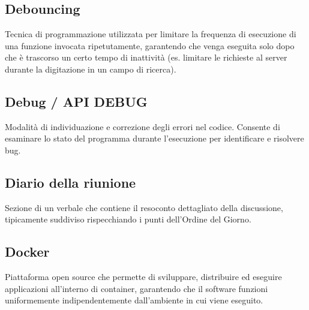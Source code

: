 \documentclass[a4paper, 11pt, oneside]{scrartcl} %
\begin{document}
\vspace{0.5cm}

\subsection*{Debouncing}


Tecnica di programmazione utilizzata per limitare la frequenza di esecuzione di una funzione invocata ripetutamente, garantendo che venga eseguita solo dopo che è trascorso un certo tempo di inattività (es. limitare le richieste al server durante la digitazione in un campo di ricerca).

\vspace{0.5cm}

\subsection*{Debug / API DEBUG}


Modalità di individuazione e correzione degli errori nel codice. Consente di esaminare lo stato del programma durante l'esecuzione per identificare e risolvere bug.

\vspace{0.5cm}

\subsection*{Diario della riunione}


Sezione di un verbale che contiene il resoconto dettagliato della discussione, tipicamente suddiviso rispecchiando i punti dell'Ordine del Giorno.

\vspace{0.5cm}

\subsection*{Docker}
Piattaforma open source che permette di sviluppare, distribuire ed eseguire applicazioni all'interno di container, garantendo che il software funzioni uniformemente indipendentemente dall'ambiente in cui viene eseguito.
\vspace{0.5cm}
\end{document}
